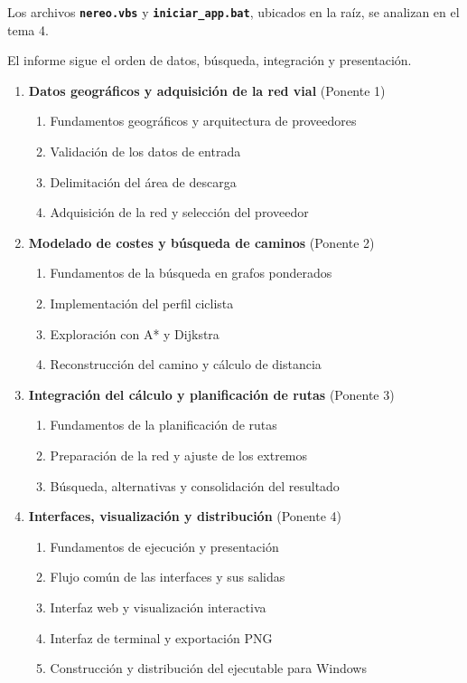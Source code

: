 \documentclass[11pt,a4paper]{article}
\begin{document}
Los archivos \textbf{\textcolor{navyreport}{\texttt{nereo.vbs}}} y \textbf{\textcolor{navyreport}{\texttt{iniciar\_app.bat}}}, ubicados en la raíz, se analizan en el tema 4.

El informe sigue el orden de datos, búsqueda, integración y presentación.
\clearpage
\begin{enumerate}
\item \textbf{Datos geográficos y adquisición de la red vial} (Ponente 1)
  \begin{enumerate}
    \item Fundamentos geográficos y arquitectura de proveedores
    \item Validación de los datos de entrada
    \item Delimitación del área de descarga
    \item Adquisición de la red y selección del proveedor
  \end{enumerate}
\item \textbf{Modelado de costes y búsqueda de caminos} (Ponente 2)
  \begin{enumerate}
    \item Fundamentos de la búsqueda en grafos ponderados
    \item Implementación del perfil ciclista
    \item Exploración con A* y Dijkstra
    \item Reconstrucción del camino y cálculo de distancia
  \end{enumerate}
\item \textbf{Integración del cálculo y planificación de rutas} (Ponente 3)
  \begin{enumerate}
    \item Fundamentos de la planificación de rutas
    \item Preparación de la red y ajuste de los extremos
    \item Búsqueda, alternativas y consolidación del resultado
  \end{enumerate}
\item \textbf{Interfaces, visualización y distribución} (Ponente 4)
  \begin{enumerate}
    \item Fundamentos de ejecución y presentación
    \item Flujo común de las interfaces y sus salidas
    \item Interfaz web y visualización interactiva
    \item Interfaz de terminal y exportación PNG
    \item Construcción y distribución del ejecutable para Windows
  \end{enumerate}
\end{enumerate}
\end{document}
